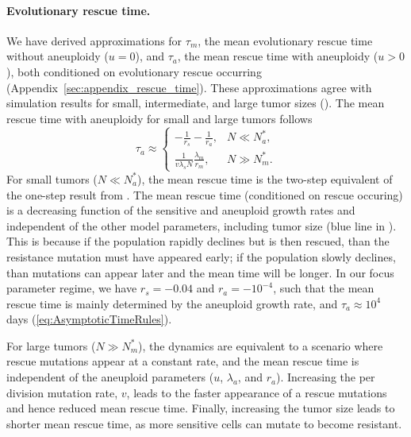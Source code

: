 \documentclass[12pt]{extarticle}
\renewcommand{\Delta}{r}
\begin{document}
\paragraph{Evolutionary rescue time.}
We have derived approximations for $\tau_m$, the mean evolutionary rescue time without aneuploidy ($u=0$), and $\tau_a$, the mean rescue time with aneuploidy ($u>0$), both conditioned on evolutionary rescue occurring (Appendix~\ref{sec:appendix_rescue_time}).
These approximations agree with simulation results for small, intermediate, and large tumor sizes ().
The mean rescue time with aneuploidy for small and large tumors follows
\begin{equation}  \label{eq:AsymptoticTimeRules}
\tau_a \approx \begin{cases}
    -\frac{1}{\Delta_s}-\frac{1}{\Delta_a} ,&
 N \ll N_a^* ,\\ 
  \frac{1}{v\lambda_s N}   \frac{\lambda_m}{\Delta_m} ,& 
  N \gg N_m^* .
  \end{cases}
\end{equation} 
For small tumors ($ N \ll N_a^*$), the mean rescue time is the two-step equivalent of the one-step result from \citet[expectation of eq.~18]{orr2014population}. The mean rescue time (conditioned on rescue occuring) is a decreasing function of the sensitive and aneuploid growth rates and independent of the other model parameters, including tumor size (blue line in ). This is because if the population rapidly declines but is then rescued, than the resistance mutation must have appeared early; if the population slowly declines, than mutations can appear later and the mean time will be longer. In our focus parameter regime, we have $\Delta_s=-0.04$ and $\Delta_a=-10^{-4}$, such that the mean rescue time is mainly determined by the aneuploid growth rate, and $\tau_a \approx 10^4$ days (\cref{eq:AsymptoticTimeRules}). %

For large tumors ($N \gg N_m^*$), the dynamics are equivalent to a scenario where rescue mutations appear at a constant rate, and the mean rescue time is independent of the aneuploid parameters ($u$, $\lambda_a$, and $\Delta_a$). Increasing the per division mutation rate, $v$, leads to the faster appearance of a rescue mutations and hence reduced mean rescue time. Finally, increasing the tumor size leads to shorter mean rescue time, as more sensitive cells can mutate to become resistant. %
\end{document}
